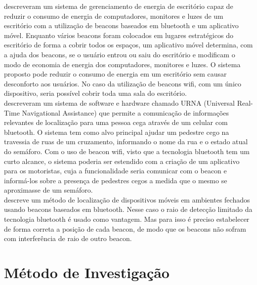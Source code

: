 \cite{ChoiParkLee} descreveram um sistema de gerenciamento de energia de escritório capaz de reduzir o consumo de energia de computadores, monitores e luzes de um escritório com a utilização de beacons baseados em bluetooth e um aplicativo móvel. Enquanto vários beacons foram colocados em lugares estratégicos do escritório de forma a cobrir todos os espaços, um aplicativo móvel determina, com a ajuda dos beacons, se o usuário entrou ou saiu do escritório e modificam o modo de economia de energia dos computadores, monitores e luzes. O sistema proposto pode reduzir o consumo de energia em um escritório sem causar desconforto aos usuários. No caso da utilização de beacons wifi, com um único dispositivo, seria possível cobrir toda uma sala do escritório. \\
\indent \cite{Bohonos} descreveram um sistema de software e hardware chamado URNA (Universal Real-Time Navigational Assistance) que permite a comunicação de informações relevantes de localização para uma pessoa cega através de um celular com bluetooth. O sistema tem como alvo principal ajudar um pedestre cego na travessia de ruas de um cruzamento, informando o nome da rua e o estado atual do semáforo. Com o uso de beacon wifi, visto que a tecnologia bluetooth tem um curto alcance, o sistema poderia ser estendido com a criação de um aplicativo para os motoristas, cuja a funcionalidade seria comunicar com o beacon e informá-los sobre a presença de pedestres cegos a medida que o mesmo se aproximasse de um semáforo. \\
\indent \cite{Chawathe} descreve um método de localização de dispositivos móveis em ambientes fechados usando beacons baseados em bluetooth. Nesse caso o raio de detecção limitado da tecnologia bluetooth é usado como vantagem. Mas para isso é preciso estabelecer de forma correta a posição de cada beacon, de modo que os beacons não sofram com interferência de raio de outro beacon.

\section{Método de Investigação}
\label{sec:metodo-investigacao}

